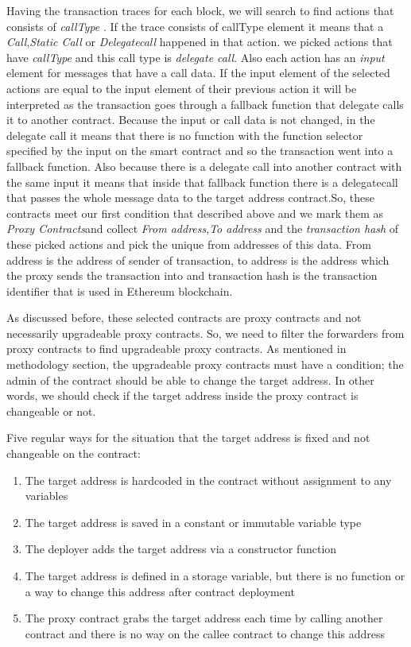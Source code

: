 Having the transaction traces for each block, we will search to find actions that consists of \textit{callType} . If the trace consists of callType element it means that a \textit{Call},\textit{Static Call} or \textit{Delegatecall} happened in that action. we picked actions that have \textit{callType} and this call type is \textit{delegate call}. Also each action has an \textit{input} element for messages that have a call data. If the input element of the selected actions are equal to the input element of their previous action it will be interpreted as the transaction goes through a fallback function that delegate calls it to another contract. Because the input or call data is not changed, in the delegate call it means that there is no function with the function selector specified by the input on the smart contract and so the transaction went into a fallback function. Also because there is a delegate call into another contract with the same input it means that inside that fallback function there is a delegatecall that passes the whole message data to the target address contract.So, these contracts meet our first condition that described above and we mark them as \textit{Proxy Contracts}and collect \textit{From address},\textit{To address} and the \textit{transaction hash} of these picked actions and pick the unique from addresses of this data. From address is the address of sender of transaction, to address is the address which the proxy sends the transaction into and transaction hash is the transaction identifier that is used in Ethereum blockchain. 

As discussed before, these selected contracts are proxy contracts and not necessarily upgradeable proxy contracts. So, we need to filter the forwarders from proxy contracts to find upgradeable proxy contracts. As mentioned in methodology section, the upgradeable proxy contracts must have a condition; the admin of the contract should be able to change the target address. In other words, we should check if the target address inside the proxy contract is changeable or not.

Five regular ways for the situation that the target address is fixed and not changeable on the contract:
\begin{enumerate}
  \item The target address is hardcoded in the contract without assignment to any variables
  \item The target address is saved in a constant or immutable variable type 
  \item The deployer adds the target address via a constructor function
  \item The target address is defined in a storage variable, but there is no function or a way to change this address after contract deployment
  \item The proxy contract grabs the target address each time by calling another contract and there is no way on the callee contract to change this address
\end{enumerate} 

